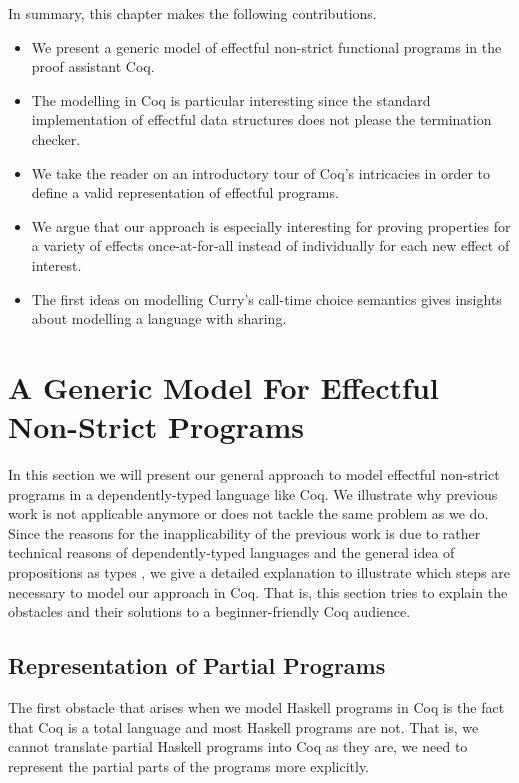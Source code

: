 In summary, this chapter makes the following contributions.

\begin{itemize}
\item We present a generic model of effectful non-strict functional
  programs in the proof assistant Coq.
\item The modelling in Coq is particular interesting since the
  standard implementation of effectful data structures does not please
  the termination checker.
\item We take the reader on an introductory tour of Coq's intricacies in
order to define a valid representation of effectful programs.
\item We argue that our approach is especially interesting for proving
  properties for a variety of effects once-at-for-all instead of
  individually for each new effect of interest.
\item The first ideas on modelling Curry's call-time choice semantics
  gives insights about modelling a language with sharing.
\end{itemize}
 
\section{A Generic Model For Effectful Non-Strict Programs}

In this section we will present our general approach to model
effectful non-strict programs in a dependently-typed language like
Coq.
We illustrate why previous work is not applicable anymore or does not
tackle the same problem as we do.
Since the reasons for the inapplicability of the previous work is due
to rather technical reasons of dependently-typed languages and the
general idea of propositions as types \citep{wadler2015propositions},
we give a detailed explanation to illustrate which steps are necessary
to model our approach in Coq.
That is, this section tries to explain the obstacles and their
solutions to a beginner-friendly Coq audience.

\subsection{Representation of Partial Programs}
The first obstacle that arises when we model Haskell programs in Coq
is the fact that Coq is a total language and most Haskell programs are
not.
That is, we cannot translate partial Haskell programs into Coq as they
are, we need to represent the partial parts of the programs more
explicitly.

